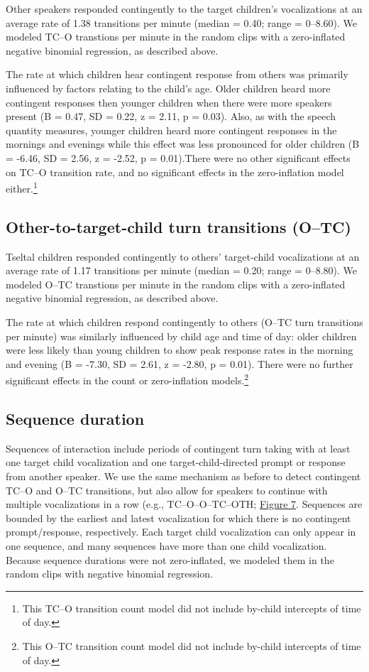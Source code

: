 \documentclass[floatsintext,man]{apa6}
\theoremstyle{definition}
\theoremstyle{definition}
\theoremstyle{definition}
\theoremstyle{remark}
\begin{document}
Other speakers responded contingently to the target children's
vocalizations at an average rate of 1.38 transitions per minute (median
= 0.40; range = 0--8.60). We modeled TC--O transtions per minute in the
random clips with a zero-inflated negative binomial regression, as
described above.

The rate at which children hear contingent response from others was
primarily influenced by factors relating to the child's age. Older
children heard more contingent responses then younger children when
there were more speakers present (B = 0.47, SD = 0.22, z = 2.11, p =
0.03). Also, as with the speech quantity measures, younger children
heard more contingent responses in the mornings and evenings while this
effect was less pronounced for older children (B = -6.46, SD = 2.56, z =
-2.52, p = 0.01).There were no other significant effects on TC--O
transition rate, and no significant effects in the zero-inflation model
either.\footnote{This TC--O transition count model did not include
  by-child intercepts of time of day.}

\subsection{Other-to-target-child turn transitions
(O--TC)}\label{other-to-target-child-turn-transitions-otc}

Tseltal children responded contingently to others' target-child
vocalizations at an average rate of 1.17 transitions per minute (median
= 0.20; range = 0--8.80). We modeled O--TC transtions per minute in the
random clips with a zero-inflated negative binomial regression, as
described above.

The rate at which children respond contingently to others (O--TC turn
transitions per minute) was similarly influenced by child age and time
of day: older children were less likely than young children to show peak
response rates in the morning and evening (B = -7.30, SD = 2.61, z =
-2.80, p = 0.01). There were no further significant effects in the count
or zero-inflation models.\footnote{This O--TC transition count model did
  not include by-child intercepts of time of day.}

\subsection{Sequence duration}\label{sequence-duration}

Sequences of interaction include periods of contingent turn taking with
at least one target child vocalization and one target-child-directed
prompt or response from another speaker. We use the same mechanism as
before to detect contingent TC--O and O--TC transitions, but also allow
for speakers to continue with multiple vocalizations in a row (e.g.,
TC--O--O--TC--OTH; \protect\hyperlink{fig7}{Figure 7}. Sequences are
bounded by the earliest and latest vocalization for which there is no
contingent prompt/response, respectively. Each target child vocalization
can only appear in one sequence, and many sequences have more than one
child vocalization. Because sequence durations were not zero-inflated,
we modeled them in the random clips with negative binomial regression.
\end{document}
